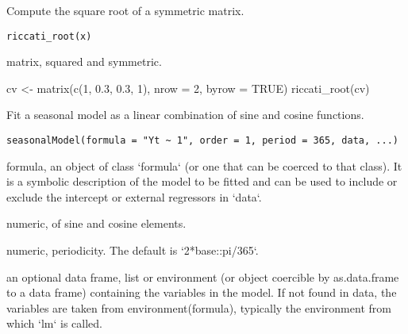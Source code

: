 \documentclass[a4paper]{book}
\begin{document}
%
\begin{Description}\relax
Compute the square root of a symmetric matrix.
\end{Description}
%
\begin{Usage}
\begin{verbatim}
riccati_root(x)
\end{verbatim}
\end{Usage}
%
\begin{Arguments}
\begin{ldescription}
\item[\code{x}] matrix, squared and symmetric.
\end{ldescription}
\end{Arguments}
%
\begin{Examples}
\begin{ExampleCode}
cv <- matrix(c(1, 0.3, 0.3, 1), nrow = 2, byrow = TRUE)
riccati_root(cv)

\end{ExampleCode}
\end{Examples}
%
\begin{Description}\relax
Fit a seasonal model as a linear combination of sine and cosine functions.
\end{Description}
%
\begin{Usage}
\begin{verbatim}
seasonalModel(formula = "Yt ~ 1", order = 1, period = 365, data, ...)
\end{verbatim}
\end{Usage}
%
\begin{Arguments}
\begin{ldescription}
\item[\code{formula}] formula, an object of class `formula` (or one that can be coerced to that class).
It is a symbolic description of the model to be fitted and can be used to include or exclude the intercept or external regressors in `data`.

\item[\code{order}] numeric, of sine and cosine elements.

\item[\code{period}] numeric, periodicity. The default is `2*base::pi/365`.

\item[\code{data}] an optional data frame, list or environment (or object coercible by as.data.frame to a data frame) containing the variables in the model.
If not found in data, the variables are taken from environment(formula), typically the environment from which `lm` is called.
\end{ldescription}
\end{Arguments}
\end{document}
